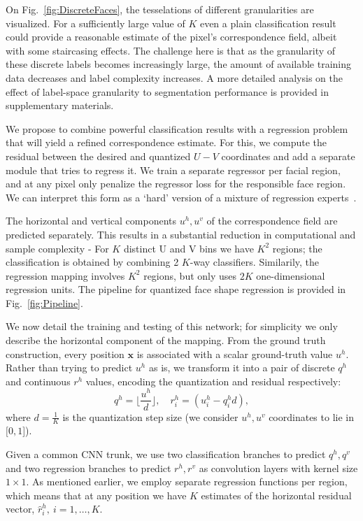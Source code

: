 On Fig.~\ref{fig:DiscreteFaces}, the tesselations of different granularities are visualized. For a sufficiently large value of $K$ even a plain classification result could provide a reasonable estimate of the pixel's correspondence field, albeit with some staircasing effects. The challenge here is that as the granularity of these discrete labels becomes increasingly large, the amount of available training data decreases and label complexity increases. A more detailed analysis on the effect of label-space granularity to segmentation performance is provided in supplementary materials.

We propose to combine powerful classification results with a regression problem that will yield a  refined  correspondence estimate. For this, we compute the residual between the desired and quantized $U-V$  coordinates and add a separate module that tries to regress it. We train a separate regressor per facial region, and at any pixel only penalize the regressor loss for the responsible face region. We can interpret this form as a `hard' version of a mixture of regression experts~\cite{JordanJ94}. 

The horizontal and vertical components $u^h,u^v$ of the correspondence field are predicted separately. This results in a substantial reduction in computational and sample complexity -  For $K$ distinct U and V bins we have $K^2$ regions; the classification is obtained by combining 2 $K$-way classifiers. Similarily, the regression mapping involves $K^2$ regions, but only uses $2 K$ one-dimensional regression units. The pipeline for quantized face shape regression is provided in Fig.~\ref{fig:Pipeline}.

We now detail the training and testing of this network;  for simplicity we only describe the horizontal component of the mapping. 
From the ground truth construction, every position $\bm{x}$ is associated with a scalar ground-truth value $u^h$. Rather than trying to predict $u^h$ as is, we transform it into a pair of discrete $q^h$ and continuous $r^h$ values, encoding the quantization and residual respectively:
\begin{equation} 
q^h =  \lfloor {\frac{u^h}{d}} \rfloor, \quad  r_i^h =   \left(u^h_i - q^h_i d  \right),
\end{equation}
where $d = \frac{1}{K}$ is the quantization step size (we consider $u^h,u^v$ coordinates to lie in $[0,1$]).

Given a common CNN trunk, we use two classification branches to predict $q^h, q^v$ and two regression branches to predict $r^h,r^v$ as convolution layers with kernel size $1\times1$. As mentioned earlier, we employ separate regression functions per region, which means that at any position we have $K$ estimates of the horizontal residual vector, $\hat{r}^h_{i},~i=1,\ldots,K$.

